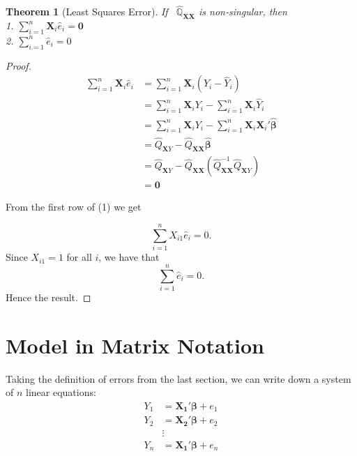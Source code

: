 \documentclass[
]{book}
\newtheorem{theorem}{Theorem}[chapter]
\theoremstyle{definition}
\theoremstyle{definition}
\theoremstyle{definition}
\theoremstyle{definition}
\theoremstyle{remark}
\begin{document}
\begin{theorem}[Least Squares Error]
\protect\hypertarget{thm:olserror}{}\label{thm:olserror}If ~\(\widehat{\mathbb{Q}}_{\pmb{XX}}\) is non-singular, then\\
1. \(\sum\limits_{i=1}^n\pmb{X}_i\widehat{e}_i=\pmb{0}\)\\
2. \(\sum\limits_{i=1}^n\widehat{e}_i=0\)
\end{theorem}

\begin{proof}
\begin{align}
\sum\limits_{i=1}^n\pmb{X}_i\widehat{e}_i 
&=\sum\limits_{i=1}^n\pmb{X}_i(Y_i-\widehat{Y}_i) \\
&=\sum\limits_{i=1}^n\pmb{X}_iY_i-\sum\limits_{i=1}^n\pmb{X}_i\widehat{Y}_i \\
&=\sum\limits_{i=1}^n\pmb{X}_iY_i-\sum\limits_{i=1}^n\pmb{X}_i\pmb{X}_i'\pmb{\widehat{\beta}} \\
&=\widehat{Q}_{\pmb{X}Y}-\widehat{Q}_{\pmb{XX}}\pmb{\widehat{\beta}} \\
&=\widehat{Q}_{\pmb{X}Y}-\widehat{Q}_{\pmb{XX}}
\left( \widehat{Q}_{\pmb{XX}}^{-1} \widehat{Q}_{\pmb{X}Y} \right) \\
&=\pmb{0}
\end{align}

From the first row of (1) we get

\[
\sum\limits_{i=1}^n X_{i1}\widehat{e}_i=0.
\]
Since \(X_{i1}=1\) for all \(i\), we have that
\[
\sum\limits_{i=1}^n\widehat{e}_i=0.
\]
Hence the result.
\end{proof}

\hypertarget{model-in-matrix-notation}{%
\section{Model in Matrix Notation}\label{model-in-matrix-notation}}

Taking the definition of errors from the last section, we can write down a system of \(n\) linear equations:
\begin{align}
Y_1 &= \pmb{X_1}'\pmb{\beta} + e_1 \\
Y_2 &= \pmb{X_2}'\pmb{\beta} + e_2 \\
& \vdots \\
Y_n &= \pmb{X_1}'\pmb{\beta} + e_n
\end{align}
\end{document}
